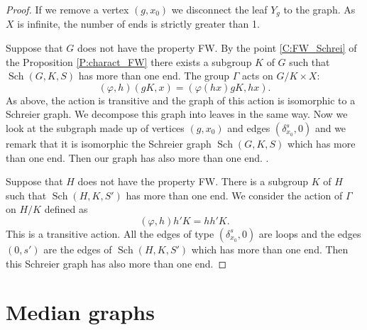 \documentclass[a4paper]{article}
\theoremstyle{remark}%
\DeclareMathOperator\Sch{Sch}
\renewcommand*{\phi}{\varphi}
\begin{document}
\begin{proof}
If we remove a vertex $(g,x_0)$ we disconnect the leaf $Y_g$ to the graph. As $X$ is infinite, the number of ends is strictly greater than 1.

Suppose that $G$ does not have the property FW. By the point \ref{C:FW_Schrei} of the Proposition \ref{P:charact_FW} there exists a subgroup $K$ of $G$ such that $\Sch(G,K,S)$ has more than one end. The group $\Gamma$ acts on $G/K \times X$:  
\begin{equation*}
(\phi,h)(gK,x) = (\phi(hx) gK, hx).
\end{equation*}
As above, the action is transitive and the graph of this action is isomorphic to a Schreier graph. We decompose this graph into leaves in the same way. Now we look at the subgraph made up of vertices $(g,x_0)$ and edges $(\delta_{x_0}^s,0)$ and we remark that it is isomorphic the Schreier graph $\Sch(G,K,S)$ which has more than one end. Then our graph has also more than one end.
.


Suppose that $H$ does not have the property FW. There is a subgroup $K$ of $H$ such that $\Sch(H,K,S')$ has more than one end. We consider the action of $\Gamma$ on $H/K$ defined as
\begin{equation*}
 (\phi,h)h'K = hh'K.
\end{equation*}
This is a transitive action. All the edges of type $(\delta_{x_0}^s, 0)$ are loops and the edges $(0, s')$ are the edges of $\Sch(H,K,S')$ which has more than one end. Then this Schreier graph has also more than one end.
\end{proof}


\section{Median graphs}














\enddocument
\end{document}
